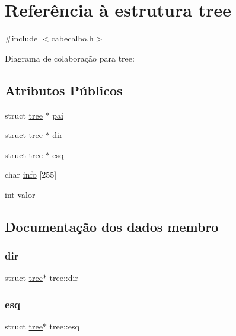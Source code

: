 \hypertarget{structtree}{}\section{Referência à estrutura tree}
\label{structtree}


{\ttfamily \#include $<$cabecalho.\+h$>$}



Diagrama de colaboração para tree\+:
\subsection*{Atributos Públicos}
\begin{DoxyCompactItemize}
\item 
struct \hyperlink{structtree}{tree} $\ast$ \hyperlink{structtree_a892dc68ebc0fe35b6ca7ef618a48f40a}{pai}
\item 
struct \hyperlink{structtree}{tree} $\ast$ \hyperlink{structtree_a7e8772c10923b3b7abbe1bcf69605857}{dir}
\item 
struct \hyperlink{structtree}{tree} $\ast$ \hyperlink{structtree_aed1a08ff52888fc196c29399e9f0f7e9}{esq}
\item 
char \hyperlink{structtree_a33363586fc94b74ed916c1a047b40c09}{info} \mbox{[}255\mbox{]}
\item 
int \hyperlink{structtree_ab2137451cda4f3a42fb8de7085c1992c}{valor}
\end{DoxyCompactItemize}


\subsection{Documentação dos dados membro}
\mbox{\label{structtree_a7e8772c10923b3b7abbe1bcf69605857}} 
\subsubsection{\texorpdfstring{dir}{dir}}
{\footnotesize\ttfamily struct \hyperlink{structtree}{tree}$\ast$ tree\+::dir}

\mbox{\label{structtree_aed1a08ff52888fc196c29399e9f0f7e9}} 
\subsubsection{\texorpdfstring{esq}{esq}}
{\footnotesize\ttfamily struct \hyperlink{structtree}{tree}$\ast$ tree\+::esq}

